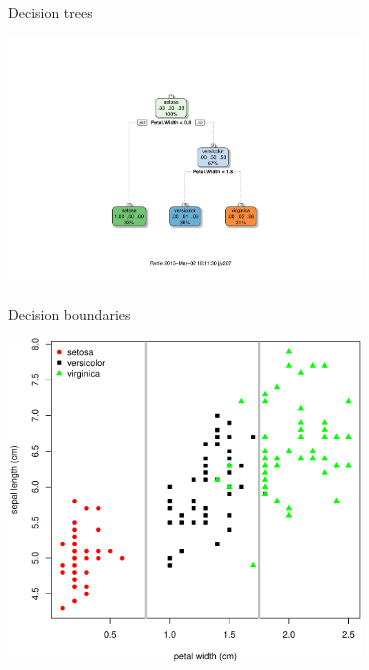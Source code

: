 \documentclass[pdf]{beamer}
\begin{document}
\begin{frame}{Decision trees}
\begin{center}
	\includegraphics[width=0.7\textwidth]{niceTree.pdf}	
\end{center}
\end{frame}

\begin{frame}{Decision boundaries}
\begin{center}
	\includegraphics[width=0.7\textwidth]{irisPlotBound.pdf}
\end{center}
\end{frame}
\end{document}
